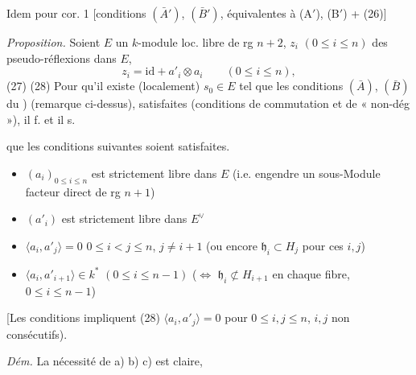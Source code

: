 \documentclass[11pt,a4paper]{article}
\begin{document}

Idem pour cor. 1 [conditions $(\bar A')$, $(\bar B')$, équivalentes à (A$'$), (B$'$) + (26)]

\emph{Proposition.} Soient $E$ un $k$-module loc. libre de rg $n+2$, $z_i$ $(0 \leq i \leq n)$ des pseudo-réflexions dans $E$,
\[
z_i = \mathrm{id} + a'_i \otimes a_i \qquad (0 \leq i \leq n),
\]
(27)  
(28) Pour qu'il existe  (localement) $s_0 \in E$ tel que les conditions $(\bar A)$, $(\bar B)$ du \ill{}) (remarque ci-dessus),  satisfaites (conditions de commutation et de « non-dég »), il f. et il s.

que les conditions suivantes soient satisfaites.
\begin{itemize}
\item[a)] $(a_i)_{0 \leq i \leq n}$ est  strictement libre dans $E$ (i.e. engendre un sous-Module facteur direct de rg $n+1$)
\item[a$'$)] $(a'_i)$ est strictement libre dans $E^{\vee}$
\item[b)] $\langle a_i, a'_j\rangle = 0$ \quad $0 \leq i < j \leq n$, $j \neq i+1$ (ou encore $\mathfrak{h}_i \subset H_j$ pour ces $i, j$)
\item[c)] \struck{\ill{}} $\langle a_i, a'_{i+1}\rangle \in k^*$ \quad $(0 \leq i \leq n-1)$ ($\Longleftrightarrow$ $\mathfrak{h}_i \not\subset H_{i+1}$ en chaque fibre, $0 \leq i \leq n-1$)
\end{itemize}
[Les conditions impliquent  (28) $\langle a_i, a'_j\rangle = 0$ pour $0 \leq i, j \leq n$, $i, j$ non consécutifs).

\emph{Dém.} La nécessité de a) b) c) est claire,   
\end{document}
